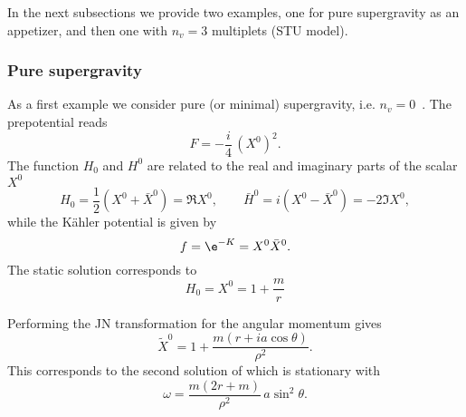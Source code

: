 In the next subsections we provide two examples,\footnotemark{} one for pure supergravity as an appetizer, and then one with $n_v = 3$ multiplets (STU model).%


\subsubsection{Pure supergravity}
\label{sec:examples:N=2-bps:pure}


As a first example we consider pure (or minimal) supergravity, i.e. $n_v = 0$~\cite[sec.~4.2]{Behrndt:1998:StationarySolutionsN2}.
The prepotential reads
\begin{equation}
	F = - \frac{i}{4}\, (X^0)^2.
\end{equation} 
The function $H_0$ and $H^0$ are related to the real and imaginary parts of the scalar $X^0$
\begin{equation}
	H_0 = \frac{1}{2} (X^0 + \bar X^0) = \Re X^0, \qquad
	\bar H^0 = i (X^0 - \bar X^0) = - 2 \Im X^0,
\end{equation} 
while the Kähler potential is given by
\begin{equation}
	f = \e^{-K} = X^0 \bar X^0.
\end{equation} 
The static solution corresponds to
\begin{equation}
	\label{matter:eq:pure-sugra-static-X0}
	H_0 = X^0 = 1 + \frac{m}{r}
\end{equation} 

Performing the JN transformation for the angular momentum gives
\begin{equation}
	\tilde X^0 = 1 + \frac{m (r + i a \cos\theta)}{\rho^2}.
\end{equation}
This corresponds to the second solution of which is stationary with
\begin{equation}
	\omega = \frac{m (2r + m)}{\rho^2}\, a \sin^2 \theta.
\end{equation} 


